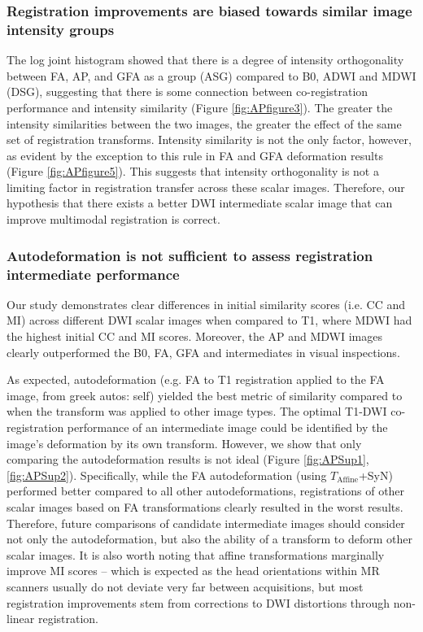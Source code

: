 \subsubsection{Registration improvements are biased towards similar image intensity groups}

The log joint histogram showed that there is a degree of intensity orthogonality between FA, AP, and GFA as a group (ASG) compared to B0, ADWI and MDWI (DSG), suggesting that there is some connection between co-registration performance and intensity similarity (Figure \ref{fig:APfigure3}). The greater the intensity similarities between the two images, the greater the effect of the same set of registration transforms. Intensity similarity is not the only factor, however, as evident by the exception to this rule in FA and GFA deformation results (Figure \ref{fig:APfigure5}). This suggests that intensity orthogonality is not a limiting factor in registration transfer across these scalar images. Therefore, our hypothesis that there exists a better DWI intermediate scalar image that can improve multimodal registration is correct.

\subsubsection{Autodeformation is not sufficient to assess registration intermediate performance}

Our study demonstrates clear differences in initial similarity scores (i.e. CC and MI) across different DWI scalar images when compared to T1, where MDWI had the highest initial CC and MI scores.  Moreover, the AP and MDWI images clearly outperformed the B0, FA, GFA and intermediates in visual inspections.

As expected, autodeformation (e.g. FA to T1 registration applied to the FA image, from greek autos: self) yielded the best metric of similarity compared to when the transform was applied to other image types. The optimal T1-DWI co-registration performance of an intermediate image could be identified by the image’s deformation by its own transform. However, we show that only comparing the autodeformation results is not ideal (Figure \ref{fig:APSup1}, \ref{fig:APSup2}). Specifically, while the FA autodeformation (using $T_{\text{Affine}}$+SyN) performed better compared to all other autodeformations, registrations of other scalar images based on FA transformations clearly resulted in the worst results. Therefore, future comparisons of candidate intermediate images should consider not only the autodeformation, but also the ability of a transform to deform other scalar images. It is also worth noting that affine transformations marginally improve MI scores – which is expected as the head orientations within MR scanners usually do not deviate very far between acquisitions, but most registration improvements stem from corrections to DWI distortions through non-linear registration.

